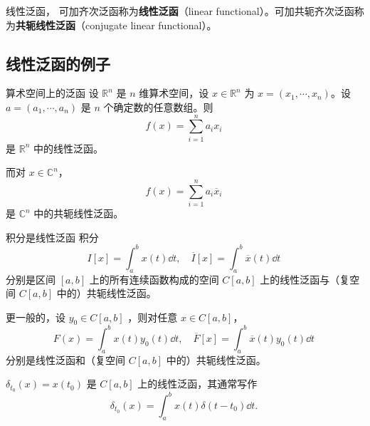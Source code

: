 \begin{definition}{线性泛函，}
可加齐次泛函称为\textbf{线性泛函}（linear functional）。可加共轭齐次泛函称为\textbf{共轭线性泛函}（conjugate linear functional）。
\end{definition}


\subsection{线性泛函的例子}

\begin{example}{算术空间上的泛函}
设 $\mathbb R^n$ 是 $n$ 维算术空间，设 $x\in\mathbb R^n$ 为 $x=(x_1,\cdots,x_n)$。设 $a=(a_1,\cdots,a_n)$ 是 $n$ 个确定数的任意数组。则
\begin{equation}
f(x)=\sum_{i=1}^n a_ix_i~
\end{equation}
是 $\mathbb R^n$ 中的线性泛函。

而对 $x\in\mathbb C^n$，
\begin{equation}
f(x)=\sum_{i=1}^n a_i\overline x_i~
\end{equation}
是  $\mathbb C^n$ 中的共轭线性泛函。

\end{example}


\begin{example}{积分是线性泛函}
积分
\begin{equation}
I[x]=\int_a^b x(t)\dd t,\quad \overline I[x]=\int_a^b \overline x(t)\dd t~
\end{equation}
分别是区间 $[a,b]$ 上的所有连续函数构成的空间 $C[a,b]$ 上的线性泛函与（复空间 $C[a,b]$ 中的）共轭线性泛函。
\end{example}

\begin{example}{}
更一般的，设 $y_0\in C[a,b]$ ，则对任意 $x\in C[a,b]$，
\begin{equation}
F(x)=\int_a^b x(t)y_0(t)\dd t,\quad\overline{F}[x]=\int_a^b \overline{x}(t)y_0(t)\dd t~
\end{equation}
分别是线性泛函和（复空间 $C[a,b]$ 中的）共轭线性泛函。
\end{example}

\begin{example}{}
$\delta_{t_0}(x)=x(t_0)$ 是 $C[a,b]$ 上的线性泛函，其通常写作
\begin{equation}
\delta_{t_0}(x)=\int_a^b x(t)\delta(t-t_0)\dd t.~
\end{equation}

\end{example}






